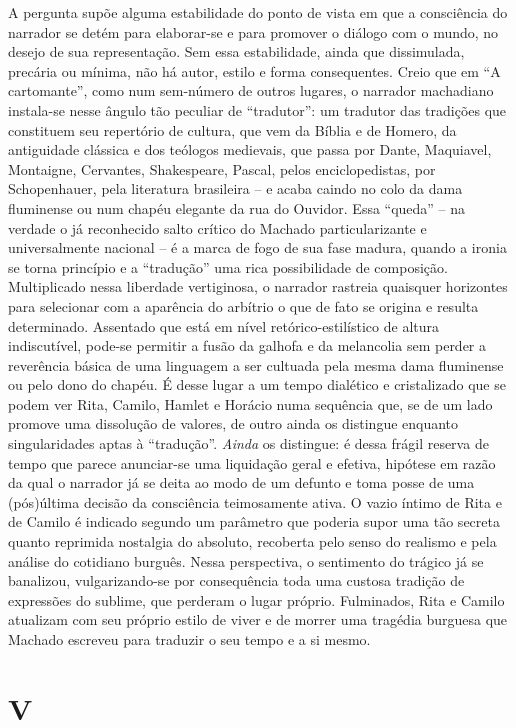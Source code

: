 A pergunta supõe alguma estabilidade do ponto de vista em que a
consciência do narrador se detém para elaborar-se e para promover o
diálogo com o mundo, no desejo de sua representação. Sem essa
estabilidade, ainda que dissimulada, precária ou mínima, não há autor,
estilo e forma consequentes. Creio que em ``A cartomante'', como num
sem-número de outros lugares, o narrador machadiano instala-se nesse
ângulo tão peculiar de ``tradutor'': um tradutor das tradições que
constituem seu repertório de cultura, que vem da Bíblia e de Homero, da
antiguidade clássica e dos teólogos medievais, que passa por Dante,
Maquiavel, Montaigne, Cervantes, Shakespeare, Pascal, pelos
enciclopedistas, por Schopenhauer, pela literatura brasileira -- e acaba
caindo no colo da dama fluminense ou num chapéu elegante da rua do
Ouvidor. Essa ``queda'' -- na verdade o já reconhecido salto crítico do
Machado particularizante e universalmente nacional -- é a marca de fogo
de sua fase madura, quando a ironia se torna princípio e a ``tradução''
uma rica possibilidade de composição. Multiplicado nessa liberdade
vertiginosa, o narrador rastreia quaisquer horizontes para selecionar
com a aparência do arbítrio o que de fato se origina e resulta
determinado. Assentado que está em nível retórico-estilístico de altura
indiscutível, pode-se permitir a fusão da galhofa e da melancolia sem
perder a reverência básica de uma linguagem a ser cultuada pela mesma
dama fluminense ou pelo dono do chapéu. É desse lugar a um tempo
dialético e cristalizado que se podem ver Rita, Camilo, Hamlet e Horácio
numa sequência que, se de um lado promove uma dissolução de valores, de
outro ainda os distingue enquanto singularidades aptas à ``tradução''.
\emph{Ainda} os distingue: é dessa frágil reserva de tempo que parece
anunciar-se uma liquidação geral e efetiva, hipótese em razão da qual o
narrador já se deita ao modo de um defunto e toma posse de uma
(pós)última decisão da consciência teimosamente ativa. O vazio íntimo de
Rita e de Camilo é indicado segundo um parâmetro que poderia supor uma
tão secreta quanto reprimida nostalgia do absoluto, recoberta pelo senso
do realismo e pela análise do cotidiano burguês. Nessa perspectiva, o
sentimento do trágico já se banalizou, vulgarizando-se por consequência
toda uma custosa tradição de expressões do sublime, que perderam o lugar
próprio. Fulminados, Rita e Camilo atualizam com seu próprio estilo de
viver e de morrer uma tragédia burguesa que Machado escreveu para
traduzir o seu tempo e a si mesmo.

\section{V}

